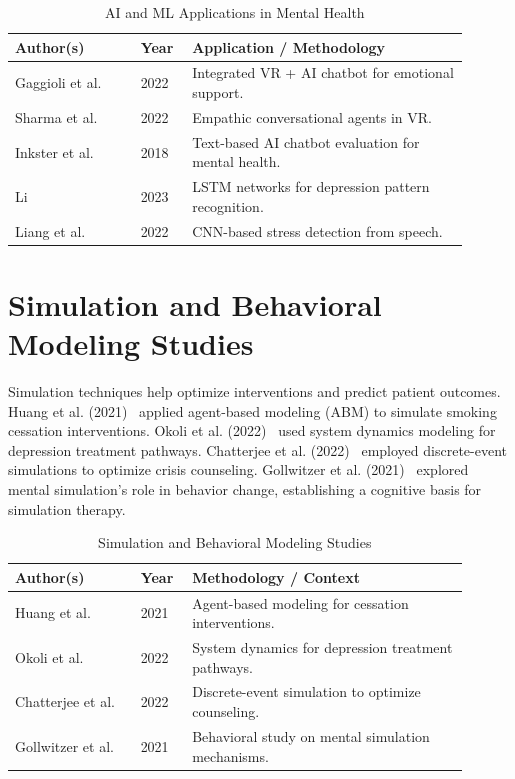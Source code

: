 \begin{table}[H]
\centering
\small
\renewcommand{\arraystretch}{1.3}
\caption{AI and ML Applications in Mental Health}
\label{tab:ai_ml}
\begin{tabular}{|p{0.25\linewidth}|p{0.1\linewidth}|p{0.55\linewidth}|}
\hline
\rowcolor{gray!15} \textbf{Author(s)} & \textbf{Year} & \textbf{Application / Methodology} \\ \hline
Gaggioli et al. & 2022 & Integrated VR + AI chatbot for emotional support. \\ \hline
Sharma et al. & 2022 & Empathic conversational agents in VR. \\ \hline
Inkster et al. & 2018 & Text-based AI chatbot evaluation for mental health. \\ \hline
Li & 2023 & LSTM networks for depression pattern recognition. \\ \hline
Liang et al. & 2022 & CNN-based stress detection from speech. \\ \hline
\end{tabular}
\end{table}
\section{Simulation and Behavioral Modeling Studies}
Simulation techniques help optimize interventions and predict patient outcomes. Huang et al. (2021)~\cite{huang2021abm} applied agent-based modeling (ABM) to simulate smoking cessation interventions. Okoli et al. (2022)~\cite{okoli2022sdm} used system dynamics modeling for depression treatment pathways. Chatterjee et al. (2022)~\cite{chatterjee2022des} employed discrete-event simulations to optimize crisis counseling. Gollwitzer et al. (2021)~\cite{gollwitzer2021behavior} explored mental simulation's role in behavior change, establishing a cognitive basis for simulation therapy.

\begin{table}[H]
\centering
\small
\renewcommand{\arraystretch}{1.3}
\caption{Simulation and Behavioral Modeling Studies}
\label{tab:sim}
\begin{tabular}{|p{0.25\linewidth}|p{0.1\linewidth}|p{0.55\linewidth}|}
\hline
\rowcolor{gray!15} \textbf{Author(s)} & \textbf{Year} & \textbf{Methodology / Context} \\ \hline
Huang et al. & 2021 & Agent-based modeling for cessation interventions. \\ \hline
Okoli et al. & 2022 & System dynamics for depression treatment pathways. \\ \hline
Chatterjee et al. & 2022 & Discrete-event simulation to optimize counseling. \\ \hline
Gollwitzer et al. & 2021 & Behavioral study on mental simulation mechanisms. \\ \hline
\end{tabular}
\end{table}

